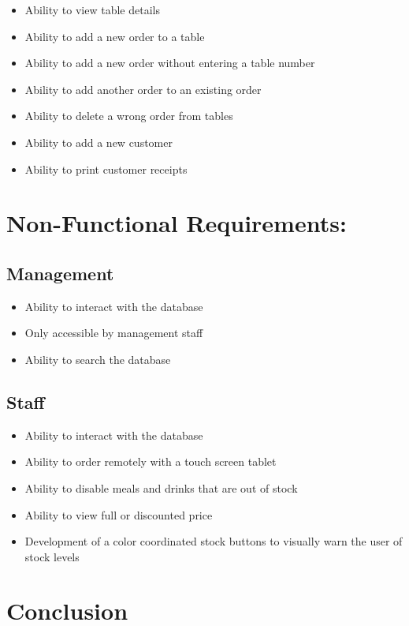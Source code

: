 \begin{itemize}
  \item Ability to view table details
  \item Ability to add a new order to a table
  \item Ability to add a new order without entering a table number
  \item Ability to add another order to an existing order
  \item Ability to delete a wrong order from tables
  \item Ability to add a new customer
  \item Ability to print customer receipts
\end{itemize}


\section{Non-Functional Requirements:} 

\subsection{Management}

\begin{itemize}
  \item Ability to interact with the database
  \item Only accessible by management staff
  \item Ability to search the database
\end{itemize}


\subsection{Staff}

\begin{itemize}
  \item Ability to interact with the database
  \item Ability to order remotely with a touch screen tablet
  \item Ability to disable meals and drinks that are out of stock 
  \item Ability to view full or discounted price
  \item Development of a color coordinated stock buttons to visually warn the user of stock levels
\end{itemize}
	

\section{Conclusion}

